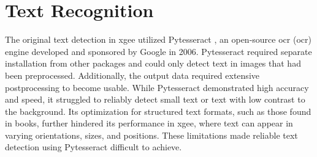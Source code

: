 \section{Text Recognition}
\label{sec:text_recognition}
The original text detection in \acrshort{xgee} utilized Pytesseract \cite{pytesseract_2024}, an open-source \acrlong{ocr} (\acrshort{ocr}) engine developed and sponsored by Google in 2006. Pytesseract required separate installation from other packages and could only detect text in images that had been preprocessed. Additionally, the output data required extensive postprocessing to become usable. While Pytesseract demonstrated high accuracy and speed, it struggled to reliably detect small text or text with low contrast to the background. Its optimization for structured text formats, such as those found in books, further hindered its performance in \acrshort{xgee}, where text can appear in varying orientations, sizes, and positions. These limitations made reliable text detection using Pytesseract difficult to achieve.

